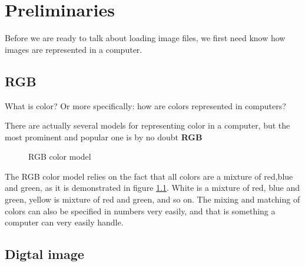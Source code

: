 \begin{comment}
  
\end{comment}

\chapter{Preliminaries}
\label{cha:preliminaries}

Before we are ready to talk about loading image files, we first need
know how images are represented in a computer.

\section{RGB}
\label{sec:rgb}

What is color? Or more specifically: how are colors represented in
computers?

There are actually several models for representing color in a
computer, but the most prominent and popular one is by no doubt
\textbf{RGB} 


\begin{figure}[h]
  \centering
  
  \caption{RGB color model}
  \label{fig:rgb}
\end{figure}

The RGB color model relies on the fact that all colors are a mixture
of red,blue and green, as it is demonstrated in figure
\ref{fig:rgb}. White is a mixture of red, blue and green, yellow is
mixture of red and green, and so on. The mixing and matching of colors
can also be specified in numbers very easily, and that is something a
computer can very easily handle.

\section{Digtal image}
\label{sec:digtal-image}


\printbibliography[heading=subbibliography]
